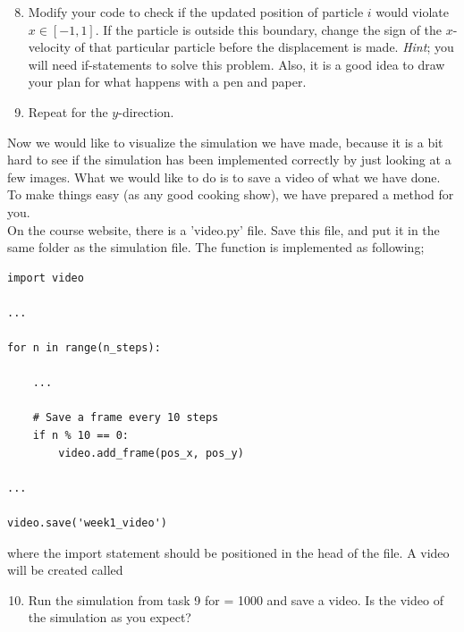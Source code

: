 \documentclass{article}
\begin{document}
\begin{enumerate}
  \setcounter{enumi}{7}
  \item Modify your code to check if the updated position of particle $i$ would violate $x \in [-1,1]$.
      If the particle is outside this boundary, change the sign of the $x$-velocity of that
      particular particle before the displacement is made.
      {\em Hint}; you will need if-statements to solve this problem. Also, it
      is a good idea to draw your plan for what happens with a pen and paper.

  \item Repeat for the $y$-direction.

\end{enumerate}


Now we would like to visualize the simulation we have made, because
it is a bit hard to see if the simulation has been implemented correctly by
just looking at a few images.
What we would like to do is to save a video of what we have done.
To make things easy (as any good cooking show), we have prepared
a method for you. \\

On the course website, there is a 'video.py' file.
Save this file, and put it in the same folder as the simulation file.
The function is implemented as following;

\begin{lstlisting}
import video

...

for n in range(n_steps):

    ...

    # Save a frame every 10 steps
    if n % 10 == 0:
        video.add_frame(pos_x, pos_y)

...

video.save('week1_video')

\end{lstlisting}

where the import statement should be positioned in the head of the file.
A video will be created called 

\begin{enumerate}
  \setcounter{enumi}{9}
  \item Run the simulation from task 9 for  = 1000 and save a video.
    Is the video of the simulation as you expect?

\end{enumerate}


\end{document}
